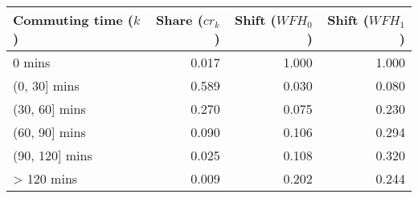 {
\def\sym#1{\ifmmode^{#1}\else\(^{#1}\)\fi}
\begin{tabular}{l*{3}{D{.}{.}{-1}}}
\toprule
Commuting time ($k$)&Share ($cr_k$)&Shift ($WFH_0$)&Shift ($WFH_1$)\\
 mins              &       0.017&       1.000&       1.000\\
(0, 30] mins        &       0.589&       0.030&       0.080\\
(30, 60] mins       &       0.270&       0.075&       0.230\\
(60, 90] mins       &       0.090&       0.106&       0.294\\
(90, 120] mins      &       0.025&       0.108&       0.320\\
> 120 mins          &       0.009&       0.202&       0.244\\
\bottomrule
\end{tabular}
}
